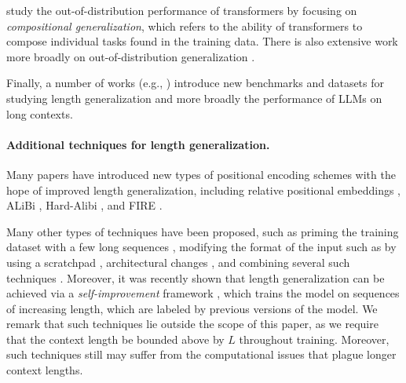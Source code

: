 \citet{ontanon_making_2022,dziri_faith_2023,hupkes_compositionality_2020} study the out-of-distribution performance of transformers by focusing on \emph{compositional generalization}, which refers to the ability of transformers to compose individual tasks found in the training data. There is also extensive work more broadly on out-of-distribution generalization \cite{nagarajan_understanding_2021,abbe_generalization_2023,kalavasis_transfer_2024}.

Finally, a number of works (e.g., \citet{hupkes_compositionality_2020,liu_exposing_2023,deletang_neural_2023,zhang_unveiling_2023,hsieh_ruler_2024}) introduce new benchmarks and datasets for studying length generalization and more broadly the performance of LLMs on long contexts. 




\paragraph{Additional techniques for length generalization.} Many papers have introduced new types of positional encoding schemes with the hope of improved length generalization, including relative positional embeddings \cite{shaw_self_2018,dai_transformer_2019,huang_improve_2020,ke_rethinking_2021}, ALiBi \cite{press_train_2022}, Hard-Alibi \cite{jelassi_repeat_2024}, and FIRE \cite{li_functional_2024}. 


Many other types of techniques have  been proposed, such as priming the training dataset with a few long sequences \cite{jelassi_length_2023}, %
modifying the format of the input \cite{shen_positional_2023,hu_casebased_2024} such as by using a scratchpad \cite{lanchantin_learning_2023}, architectural changes \cite{csordas_neural_2022,fan_looped_2024}, 
and combining several such techniques \cite{csordas_devil_2022,liu_transformers_2023,zhou_transformers_2024}. Moreover, it was recently shown that length generalization can be achieved via a \emph{self-improvement} framework \cite{lee_selfimproving_2025}, which trains the model on sequences of increasing length, which are labeled by previous versions of the model.  We remark that such techniques lie outside the scope of this paper, as we require that the context length be bounded above by $L$ throughout training. Moreover, such techniques still may suffer from the computational issues that plague longer context lengths.